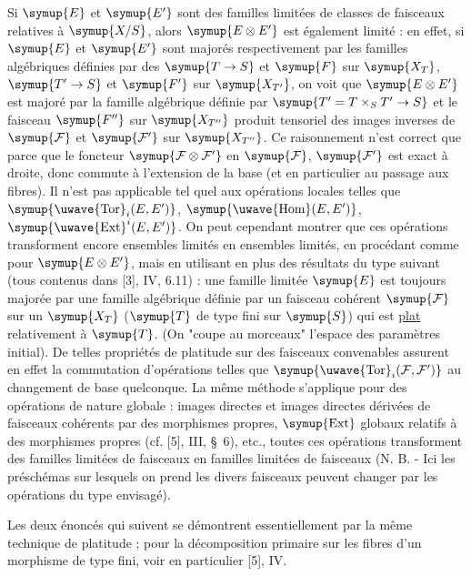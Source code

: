 Si $\symup{E}$ et $\symup{E'}$ sont des familles limitées de classes de faisceaux relatives à
$\symup{X/S}$, alors $\symup{E\otimes E'}$ est également limité : en effet, si $\symup{E}$ et $\symup{E'}$ sont
majorés respectivement par les familles algébriques définies par des
$\symup{T\to S}$ et $\symup{F}$ sur $\symup{X_T}$, $\symup{T'\to S}$ et
$\symup{F'}$ sur $\symup{X_{T'}}$, on voit que $\symup{E\otimes E'}$ est majoré par la famille
algébrique définie par $\symup{T'=T\times_S T'\to S}$ et le faisceau
$\symup{F''}$ sur $\symup{X_{T''}}$ produit tensoriel des images inverses de
$\symup{\mathcal F}$ et $\symup{\mathcal F'}$ sur $\symup{X_{T''}}$. Ce raisonnement n'est correct que
parce que le foncteur $\symup{\mathcal F\otimes\mathcal F'}$ en $\symup{\mathcal F}$,
$\symup{\mathcal F'}$ est exact à droite, donc commute à l'extension de la base (et en
particulier au passage aux fibres). Il n'est pas applicable tel quel aux
opérations locales telles que $\symup{\mathop{\text{\uwave{Tor}}}\nolimits_i(E,E')}$,
$\symup{\mathop{\text{\uwave{Hom}}}\nolimits(E,E')}$, $\symup{\mathop{\text{\uwave{Ext}}}\nolimits^i(E,E')}$. On peut cependant
montrer que ces opérations transforment encore ensembles limités en ensembles
limités, en procédant comme pour $\symup{E\otimes E'}$, mais en utilisant en plus des
résultats du type suivant (tous contenus dans [3], IV, 6.11) : une famille
limitée $\symup{E}$ est toujours majorée par une famille algébrique définie par un
faisceau cohérent $\symup{\mathcal F}$ sur un $\symup{X_T}$ ($\symup{T}$ de type fini sur $\symup{S}$) qui est
\uline{plat} relativement à $\symup{T}$. (On "coupe au morceaux" l'espace des paramètres
initial). De telles
propriétés de platitude sur des faisceaux convenables assurent en effet la
commutation d'opérations telles que $\symup{\mathop{\text{\uwave{Tor}}}\nolimits_i(\mathcal F,\mathcal
F')}$ au changement de base quelconque. La même méthode s'applique pour des
opérations de nature globale : images directes et images directes dérivées de
faisceaux cohérents par des morphismes propres, $\symup{\operatorname{Ext}}$ globaux
relatifs à des morphismes propres (cf. [5], III, \S~6), etc., toutes ces
opérations transforment des familles limitées de faisceaux en familles limitées
de faisceaux (N. B. - Ici les préschémas sur lesquels on prend les divers
faisceaux peuvent changer par les opérations du type envisagé).

Les deux énoncés qui suivent se démontrent essentiellement par la même
technique de platitude ; pour la décomposition primaire sur les fibres d'un
morphisme de type fini, voir en particulier [5], IV.

